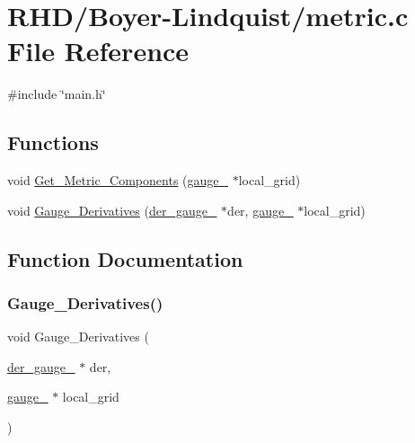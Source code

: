\hypertarget{Boyer-Lindquist_2metric_8c}{}\section{R\+H\+D/\+Boyer-\/\+Lindquist/metric.c File Reference}
\label{Boyer-Lindquist_2metric_8c}
{\ttfamily \#include \char`\"{}main.\+h\char`\"{}}\newline
\subsection*{Functions}
\begin{DoxyCompactItemize}
\item 
void \hyperlink{Boyer-Lindquist_2metric_8c_a18642caac9855aeac797fbaba90b64d1}{Get\+\_\+\+Metric\+\_\+\+Components} (\hyperlink{structgauge__}{gauge\+\_\+} $\ast$local\+\_\+grid)
\item 
void \hyperlink{Boyer-Lindquist_2metric_8c_afd567a147123bb7e7618da4b0263fefe}{Gauge\+\_\+\+Derivatives} (\hyperlink{structder__gauge__}{der\+\_\+gauge\+\_\+} $\ast$der, \hyperlink{structgauge__}{gauge\+\_\+} $\ast$local\+\_\+grid)
\end{DoxyCompactItemize}


\subsection{Function Documentation}
\mbox{\label{Boyer-Lindquist_2metric_8c_afd567a147123bb7e7618da4b0263fefe}} 
\subsubsection{\texorpdfstring{Gauge\+\_\+\+Derivatives()}{Gauge\_Derivatives()}}
{\footnotesize\ttfamily void Gauge\+\_\+\+Derivatives (\begin{DoxyParamCaption}\item[{\hyperlink{structder__gauge__}{der\+\_\+gauge\+\_\+} $\ast$}]{der,  }\item[{\hyperlink{structgauge__}{gauge\+\_\+} $\ast$}]{local\+\_\+grid }\end{DoxyParamCaption})}

